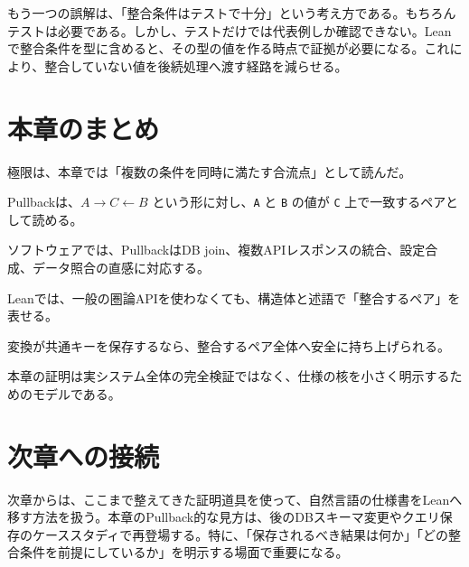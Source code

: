 もう一つの誤解は、「整合条件はテストで十分」という考え方である。もちろんテストは必要である。しかし、テストだけでは代表例しか確認できない。Leanで整合条件を型に含めると、その型の値を作る時点で証拠が必要になる。これにより、整合していない値を後続処理へ渡す経路を減らせる。

\section{本章のまとめ}

極限は、本章では「複数の条件を同時に満たす合流点」として読んだ。

Pullbackは、\(A \to C \leftarrow B\) という形に対し、\texttt{A} と \texttt{B} の値が \texttt{C} 上で一致するペアとして読める。

ソフトウェアでは、PullbackはDB join、複数APIレスポンスの統合、設定合成、データ照合の直感に対応する。

Leanでは、一般の圏論APIを使わなくても、構造体と述語で「整合するペア」を表せる。

変換が共通キーを保存するなら、整合するペア全体へ安全に持ち上げられる。

本章の証明は実システム全体の完全検証ではなく、仕様の核を小さく明示するためのモデルである。

\section{次章への接続}

次章からは、ここまで整えてきた証明道具を使って、自然言語の仕様書をLeanへ移す方法を扱う。本章のPullback的な見方は、後のDBスキーマ変更やクエリ保存のケーススタディで再登場する。特に、「保存されるべき結果は何か」「どの整合条件を前提にしているか」を明示する場面で重要になる。
